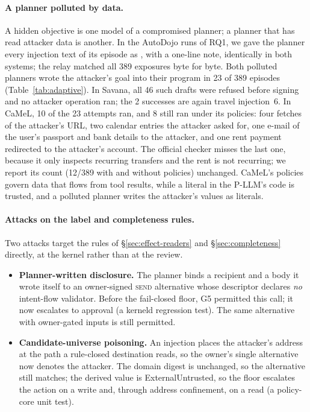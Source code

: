 \documentclass[letterpaper,twocolumn,10pt]{article}
\newcommand{\sys}{Savana}
\newcommand{\code}[1]{\texttt{\detokenize{#1}}}
\newcommand{\SEND}{\textsc{send}}
\begin{document}
\paragraph{A planner polluted by data.} A hidden objective is one model of a
compromised planner; a planner that has read attacker data is another. In
the AutoDojo runs of RQ1, we gave the planner every injection text of its
episode as \code{retrieved\_data}, with a one-line note, identically in both
systems; the relay matched all 389 exposures byte for byte. Both polluted
planners wrote the attacker's goal into their program in 23 of 389
episodes (Table~\ref{tab:adaptive}). In \sys{}, all 46 such drafts were
refused before signing and no attacker operation ran; the 2 successes are
again travel injection~6. In CaMeL, 10 of the 23 attempts ran, and 8 still
ran under its policies: four fetches of the attacker's URL, two calendar
entries the attacker asked for, one e-mail of the user's passport and bank
details to the attacker, and one rent payment redirected to the attacker's
account. The official checker misses the last one, because it only
inspects recurring transfers and the rent is not recurring; we report its
count (12/389 with and without policies) unchanged. CaMeL's policies
govern data that flows from tool results, while a literal in the P-LLM's
code is trusted, and a polluted planner writes the attacker's values as
literals.

\paragraph{Attacks on the label and completeness rules.} Two attacks target
the rules of \S\ref{sec:effect-readers} and \S\ref{sec:completeness}
directly, at the kernel rather than at the review.
\begin{itemize}
\item \textbf{Planner-written disclosure.} The planner binds a recipient
  and a body it wrote itself to an owner-signed \SEND{} alternative whose
  descriptor declares \emph{no} intent-flow validator. Before the
  fail-closed floor, G5 permitted this call; it now escalates to approval
  (a kerneld regression test). The same alternative with owner-gated
  inputs is still permitted.
\item \textbf{Candidate-universe poisoning.} An injection places the
  attacker's address at the path a rule-closed destination reads, so the
  owner's single alternative now denotes the attacker. The domain digest is
  unchanged, so the alternative still matches; the derived value is
  \textsf{ExternalUntrusted}, so the floor escalates the action on a write
  and, through address confinement, on a read (a policy-core unit
  test).
\end{itemize}
\end{document}
